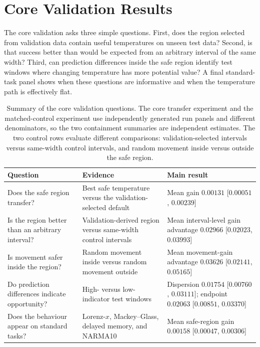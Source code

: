 \documentclass[11pt,a4paper]{article}
\begin{document}
\section{Core Validation Results}
\label{sec:core_validation}

The core validation asks three simple questions. First, does the region selected from validation data contain useful temperatures on unseen test data? Second, is that success better than would be expected from an arbitrary interval of the same width? Third, can prediction differences inside the safe region identify test windows where changing temperature has more potential value? A final standard-task panel shows when these questions are informative and when the temperature path is effectively flat.

\begin{table}[t]
\centering
\caption{Summary of the core validation questions. The core transfer experiment and the matched-control experiment use independently generated run panels and different denominators, so the two containment summaries are independent estimates. The two control rows evaluate different comparisons: validation-selected intervals versus same-width control intervals, and random movement inside versus outside the safe region.}
\label{tab:validation_summary}
\small
\begin{tabularx}{\textwidth}{>{\raggedright\arraybackslash}p{}>{\raggedright\arraybackslash}X>{\raggedright\arraybackslash}p{}}
\toprule
Question & Evidence & Main result \\
\midrule
Does the safe region transfer? & Best safe temperature versus the validation-selected default & Mean gain $0.00131$ [$0.00051$, $0.00239$] \\
Is the region better than an arbitrary interval? & Validation-derived region versus same-width control intervals & Mean interval-level gain advantage $0.02966$ [$0.02023$, $0.03993$] \\
Is movement safer inside the region? & Random movement inside versus random movement outside & Mean movement-gain advantage $0.03626$ [$0.02141$, $0.05165$] \\
Do prediction differences indicate opportunity? & High- versus low-indicator test windows & Dispersion $0.01754$ [$0.00760$, $0.03111$]; endpoint $0.02063$ [$0.00851$, $0.03370$] \\
Does the behaviour appear on standard tasks? & Lorenz-$x$, Mackey--Glass, delayed memory, and NARMA10 & Mean safe-region gain $0.00158$ [$0.00047$, $0.00306$] \\
\bottomrule
\end{tabularx}
\end{table}
\end{document}
